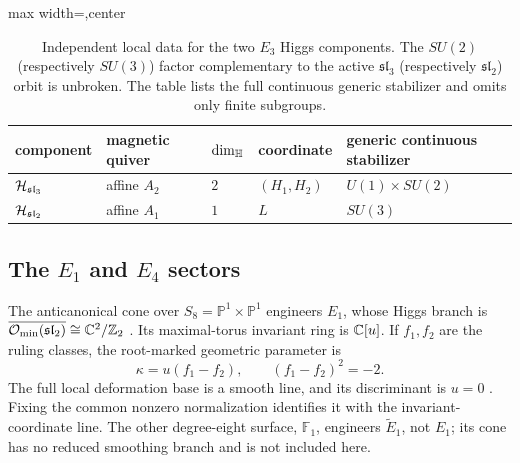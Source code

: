 \begin{table}[t]
\centering
\small
\begin{adjustbox}{max width=\textwidth,center}
\begin{tabular}{@{}lllll@{}}
\toprule
component & magnetic quiver & $\dim_{\mathbb H}$ & coordinate & generic continuous stabilizer \\
\midrule
$\mathcal H_{\mathfrak{sl}_3}$ & affine $A_2$ & $2$ & $(H_1,H_2)$ & $U(1)\times SU(2)$ \\
$\mathcal H_{\mathfrak{sl}_2}$ & affine $A_1$ & $1$ & $L$ & $SU(3)$ \\
\bottomrule
\end{tabular}
\end{adjustbox}
\caption{Independent local data for the two $E_3$ Higgs components. The
$SU(2)$ (respectively $SU(3)$) factor complementary to the active
$\mathfrak{sl}_3$ (respectively $\mathfrak{sl}_2$) orbit is unbroken. The
table lists the full continuous generic stabilizer and omits only finite
subgroups.}
\label{tab:e3-components}
\end{table}

\subsection[The E1 and E4 sectors]{The $E_1$ and $E_4$ sectors}
\label{subsec:e1-e4-sectors}

The anticanonical cone over $S_8=\mathbb P^1\times\mathbb P^1$
engineers $E_1$, whose Higgs branch is
$\overline{\mathcal O_{\min}(\mathfrak{sl}_2)}\cong\mathbb C^2/\mathbb Z_2$
\cite[Section~2.2.2]{Cremonesi:2015lsa}.
Its maximal-torus invariant ring is $\mathbb C[u]$. If $f_1,f_2$ are the
ruling classes, the root-marked geometric parameter is
\begin{equation}
 \kappa=u(f_1-f_2),\qquad (f_1-f_2)^2=-2.
 \label{eq:e1-ruling-coordinate}
\end{equation}
The full local deformation base is a smooth line, and its discriminant
is $u=0$ \cite[Lemma~3.5]{Wuebben:2026smoothing}. Fixing the common
nonzero normalization identifies it with the invariant-coordinate line.
The other degree-eight surface, $\mathbb F_1$, engineers
$\widetilde E_1$, not $E_1$; its cone has no reduced smoothing branch
and is not included here.

